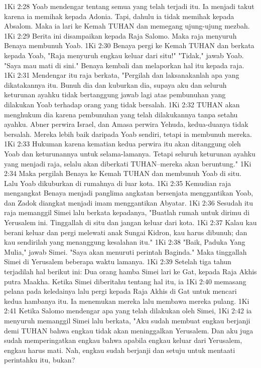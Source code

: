 1Ki 2:28  Yoab mendengar tentang semua yang telah terjadi itu. Ia menjadi takut karena ia memihak kepada Adonia. Tapi, dahulu ia tidak memihak kepada Absalom. Maka ia lari ke Kemah TUHAN dan memegang ujung-ujung mezbah.
1Ki 2:29  Berita ini disampaikan kepada Raja Salomo. Maka raja menyuruh Benaya membunuh Yoab.
1Ki 2:30  Benaya pergi ke Kemah TUHAN dan berkata kepada Yoab, "Raja menyuruh engkau keluar dari situ!" "Tidak," jawab Yoab. "Saya mau mati di sini." Benaya kembali dan melaporkan hal itu kepada raja.
1Ki 2:31  Mendengar itu raja berkata, "Pergilah dan laksanakanlah apa yang dikatakannya itu. Bunuh dia dan kuburkan dia, supaya aku dan seluruh keturunan ayahku tidak bertanggung jawab lagi atas pembunuhan yang dilakukan Yoab terhadap orang yang tidak bersalah.
1Ki 2:32  TUHAN akan menghukum dia karena pembunuhan yang telah dilakukannya tanpa setahu ayahku. Abner perwira Israel, dan Amasa perwira Yehuda, kedua-duanya tidak bersalah. Mereka lebih baik daripada Yoab sendiri, tetapi ia membunuh mereka.
1Ki 2:33  Hukuman karena kematian kedua perwira itu akan ditanggung oleh Yoab dan keturunannya untuk selama-lamanya. Tetapi seluruh keturunan ayahku yang menjadi raja, selalu akan diberkati TUHAN--mereka akan beruntung."
1Ki 2:34  Maka pergilah Benaya ke Kemah TUHAN dan membunuh Yoab di situ. Lalu Yoab dikuburkan di rumahnya di luar kota.
1Ki 2:35  Kemudian raja mengangkat Benaya menjadi panglima angkatan bersenjata menggantikan Yoab, dan Zadok diangkat menjadi imam menggantikan Abyatar.
1Ki 2:36  Sesudah itu raja memanggil Simei lalu berkata kepadanya, "Buatlah rumah untuk dirimu di Yerusalem ini. Tinggallah di situ dan jangan keluar dari kota.
1Ki 2:37  Kalau kau berani keluar dan pergi melewati anak Sungai Kidron, kau harus dibunuh; dan kau sendirilah yang menanggung kesalahan itu."
1Ki 2:38  "Baik, Paduka Yang Mulia," jawab Simei. "Saya akan menuruti perintah Baginda." Maka tinggallah Simei di Yerusalem beberapa waktu lamanya.
1Ki 2:39  Setelah tiga tahun terjadilah hal berikut ini: Dua orang hamba Simei lari ke Gat, kepada Raja Akhis putra Maakha. Ketika Simei diberitahu tentang hal itu, ia
1Ki 2:40  memasang pelana pada keledainya lalu pergi kepada Raja Akhis di Gat untuk mencari kedua hambanya itu. Ia menemukan mereka lalu membawa mereka pulang.
1Ki 2:41  Ketika Salomo mendengar apa yang telah dilakukan oleh Simei,
1Ki 2:42  ia menyuruh memanggil Simei lalu berkata, "Aku sudah membuat engkau berjanji demi TUHAN bahwa engkau tidak akan meninggalkan Yerusalem. Dan aku juga sudah memperingatkan engkau bahwa apabila engkau keluar dari Yerusalem, engkau harus mati. Nah, engkau sudah berjanji dan setuju untuk mentaati perintahku itu, bukan?

